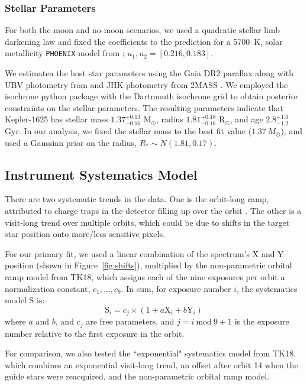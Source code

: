 \documentclass[twocolumn,trackchanges]{aastex62}
\newcommand{\Mod}[1]{\ \mathrm{mod}\ #1}
\begin{document}
\subsubsection{Stellar Parameters}
For both the moon and no-moon scenarios, we used a quadratic stellar limb darkening law and fixed the coefficients to the prediction for a 5700~K, solar metallicity \texttt{PHOENIX} model from \cite{espinoza15}; $u_1, u_2 = [0.216, 0.183]$.  

We estimatea the host star parameters using the Gaia DR2 parallax \citep{Gaia, GaiaDR2} along with UBV photometry from \citet{Everett2012} and JHK photometry from 2MASS \citep{2MASS}. We employed the isochrone python package \citep{isochrone} with the Dartmouth isochrone grid \citep{Dotter2008} to obtain posterior constraints on the stellar parameters. The resulting parameters indicate that Kepler-1625 has stellar mass $1.37^{+0.13}_{-0.16}$ M$_{\odot}$, radius $1.81^{+0.18}_{-0.16}$ R$_{\odot}$, and age $2.8^{+1.6}_{-1.2}$ Gyr. In our analysis, we fixed the stellar mass to the best fit value ($1.37\,M_\odot$), and used a Gaussian prior on the radius, $R_* \sim N(1.81, 0.17)$.


\subsection{Instrument Systematics Model}
\label{sec:sys}
There are two systematic trends in the data. One is the orbit-long ramp, attributed to charge traps in the detector filling up over the orbit \citep{zhou17}. The other is a visit-long trend over multiple orbits, which could be due to shifts in the target star position onto more/less sensitive pixels.

For our primary fit, we used a linear combination of the spectrum's X and Y position (shown in Figure~\ref{fig:shifts}), multiplied by the non-parametric orbital ramp model from TK18, which assigns each of the nine exposures per orbit a normalization constant, $c_1, ..., c_9$. In sum, for exposure number $i$, the systematics model S is:
\begin{equation}
\label{eq:sys}
    \mathrm{S}_i = c_{j}\times(1 + a\mathrm{X}_i + b\mathrm{Y}_i) 
\end{equation}
where $a$ and $b$, and $c_j$ are free parameters, and $j = i\Mod9 + 1$ is the exposure number relative to the first exposure in the orbit. 

For comparison, we also tested the ``exponential" systematics model from TK18, which combines an exponential visit-long trend, an offset after orbit 14 when the guide stars were reacquired, and the non-parametric orbital ramp model.
\end{document}
